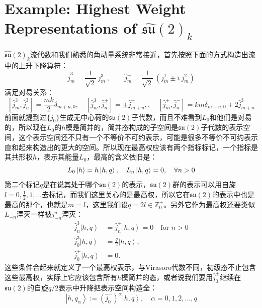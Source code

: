 \section{Example: Highest Weight Representations of $\widehat{\mathfrak{su}}(2)_{k}$ }
 $\widehat{\mathfrak{su}}(2)_{k}$流代数和我们熟悉的角动量系统非常接近，首先按照下面的方式构造出流中的上升下降算符：
 \begin{equation}
 	\hat{j}_m^3=\frac1{\sqrt{2}}~j_m^3~,\quad\quad\hat{j}_m^\pm=\frac1{\sqrt{2}}~\left(j_m^1\pm i~j_m^2\right)
 \end{equation}
满足对易关系：
\begin{equation}
	\left[\hat{j}_m^3,\hat{j}_n^3\right]=\frac{mk}2\delta_{m+n,0},\quad\left[\hat{j}_m^3,\hat{j}_n^\pm\right]=\pm\hat{j}_{m+n}^\pm,,\quad\left[\hat{j}_m^+,\hat{j}_n^-\right]=km\delta_{m+n,0}+2\hat{j}_{m+n}^3
\end{equation}
前面就提到过$\{j_0\}$生成无中心荷的$\mathfrak{su}(2)$子代数，而且不难看到$L_0$和他们是对易的，所以现在$L_0$的$h$模是简并的，简并态构成的子空间是$\mathfrak{su}(2)$子代数的表示空间，这个表示空间还不只有一个不等价不可约表示，可能是很多不等价不可约表示直和起来构造出的更大的空间。所以现在最高权应该有两个指标标记，一个指标是其共形权$h$，表示其能量$L_0$，最高的含义依旧是：
\begin{equation}
	L_0\ket{h}=h\ket{h,q},\quad L_n\ket{h,q}=0,\quad \forall n>0
\end{equation}
第二个标记$q$是在说其处于哪个$\mathfrak{su}(2)$的表示，$\mathfrak{su}(2)$群的表示可以用自旋$l=0,\frac{1}{2},1,\ldots$去标记，而我们这里关心的是最高权，所以它在$\mathfrak{su}(2)$的表示中也是最高的那个，也就是$m=l$，这里我们设$q=2l\in\mathbb{Z}^+_0$。另外它作为最高权还要类似$L_{-n}$湮灭一样被$j^a_{-n}$湮灭：
\begin{equation}
	\begin{aligned}\hat{j}_n^3\left|h,q\right\rangle&=\hat{j}_n^\pm\left|h,q\right\rangle=0\quad\text{for }n>0\\\hat{j}_0^3\left|h,q\right\rangle&=\frac{q}{2}\left|h,q\right\rangle,\\\hat{j}_0^+\left|h,q\right\rangle&=0.\end{aligned}
\end{equation}
这些条件合起来就定义了一个最高权表示，与Virasoro代数不同，初级态不止包含这些最高权，实际上它应该包含所有$h$模简并的态，或者说我们要用$\hat {j}_0^\pm$继续在$\mathfrak{su}(2)$的自旋$q/2$表示中升降把表示空间构造全：
\begin{equation}
	\left|h,q_\alpha\right\rangle:=\left(\hat{j}_0^-\right)^\alpha\left|h,q\right\rangle ,\quad \alpha =0,1,2,\ldots,q
\end{equation}

